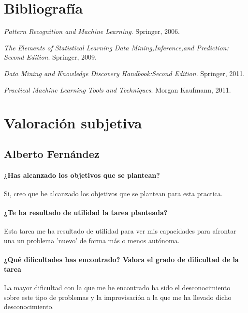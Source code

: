 \documentclass[11pt, titlepage,a4paper]{article}
\begin{document}
\section{Bibliografía}
\renewcommand{\refname}{\ }

\begin{thebibliography}{1}
	
	{\em Pattern Recognition and Machine Learning}.
	\newblock Springer, 2006.
	
	{\em The Elements of Statistical Learning Data Mining,Inference,and Prediction:
		Second Edition}.
	\newblock Springer, 2009.
	
	{\em Data Mining and Knowledge Discovery Handbook:Second Edition}.
	\newblock Springer, 2011.
	
	{\em Practical Machine Learning Tools and Techniques}.
	\newblock Morgan Kaufmann, 2011.
	
\end{thebibliography}

\section{Valoración subjetiva}

\subsection{Alberto Fernández}
\paragraph{¿Has alcanzado los objetivos que se plantean?\\}
Si, creo que he alcanzado los objetivos que se plantean para esta practica.

\paragraph{¿Te ha resultado de utilidad la tarea planteada?\\}
Esta tarea me ha resultado de utilidad para ver mis capacidades para afrontar
una un problema 'nuevo' de forma más o menos autónoma.

\paragraph{¿Qué dificultades has encontrado? Valora el grado de dificultad de
la tarea\\}
La mayor dificultad con la que me he encontrado ha sido el desconocimiento sobre
este tipo de problemas y la improvisación a la que me ha llevado dicho desconocimiento.
\end{document}

